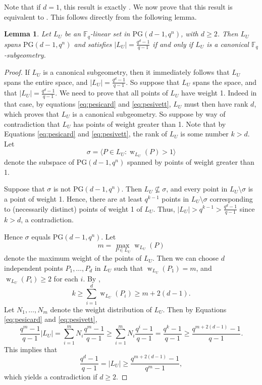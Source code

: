 \documentclass[11pt]{article}
\newtheorem{lemma}[theorem]{Lemma}
\theoremstyle{definition}
\newcommand{\fq}{{\mathbb F}_{q}}
\newcommand{\PG}{\mathrm{PG}}
\DeclareMathOperator{\ww}{w}
\begin{document}
Note that if $d=1$, this result is exactly .
We now prove that this result is equivalent to .
This follows directly from the following lemma.

\begin{lemma}
 \label{lm:subgeometry}
Let $L_U$ be an $\fq$-linear set in $\PG(d-1,q^n)$, with $d \geq 2$.
Then $L_U$ spans $\PG(d-1,q^n)$ and satisfies $|L_U| = \frac{q^d-1}{q-1}$ if and only if $L_U$ is a canonical $\fq$-subgeometry.
\end{lemma}

\begin{proof}
If $L_U$ is a canonical subgeometry, then it immediately follows that $L_U$ spans the entire space, and $|L_U| = \frac{q^d-1}{q-1}$.
So suppose that $L_U$ spans the space, and that $|L_U| = \frac{q^d-1}{q-1}$.
We need to prove that all points of $L_U$ have weight 1.
Indeed in that case, by equations \eqref{eq:pesicard} and \eqref{eq:pesivett}, $L_U$ must then have rank $d$, which proves that $L_U$ is a canonical subgeometry.
So suppose by way of contradiction that $L_U$ has points of weight greater than 1.
Note that by Equations \eqref{eq:pesicard} and \eqref{eq:pesivett}, the rank of $L_U$ is some number $k > d$.
Let
\[
 \sigma = \langle P \in L_U \colon \ww_{L_U}(P) > 1 \rangle
\]
denote the subspace of $\PG(d-1,q^n)$ spanned by points of weight greater than 1.

Suppose that $\sigma$ is not $\PG(d-1,q^n)$. 
Then $L_U \not \subseteq \sigma$, and every point in $L_U \setminus \sigma$ is a point of weight 1.
Hence, there are at least $q^{k-1}$ points in $L_U \setminus \sigma$ corresponding to (necessarily distinct) points of weight 1 of $L_U$.
Thus, $|L_U| > q^{k-1} > \frac{q^d-1}{q-1}$ since $k > d$, a contradiction.

Hence $\sigma$ equals $\PG(d-1,q^n)$.
Let
\[
 m = \max_{P \in L_U} \ww_{L_U}(P)
\]
denote the maximum weight of the points of $L_U$.
Then we can choose $d$ independent points $P_1, \dots, P_d$ in $L_U$ such that $\ww_{L_U}(P_1) = m$, and $\ww_{L_U}(P_i) \geq 2$ for each $i$.
By ,
\[
 k \geq \sum_{i=1}^d \ww_{L_U}(P_i) \geq m + 2(d-1).
\]
Let $N_1,\ldots,N_m$ denote the weight distribution of $L_U$.
Then by Equations \eqref{eq:pesicard} and \eqref{eq:pesivett},
\[
 \frac{q^m-1}{q-1} |L_U| = \sum_{i=1}^m N_i \frac{q^m-1}{q-1}
 \geq \sum_{i=1}^m N_i \frac{q^i-1}{q-1} = \frac{q^k-1}{q-1}
 \geq \frac{q^{m+2(d-1)}-1}{q-1}.
\]
This implies that
\[
  \frac{q^d-1}{q-1} = |L_U| \geq \frac{q^{m+2(d-1)}-1}{q^m-1},
\]
which yields a contradiction if $d \geq 2$.
\end{proof}
\end{document}
